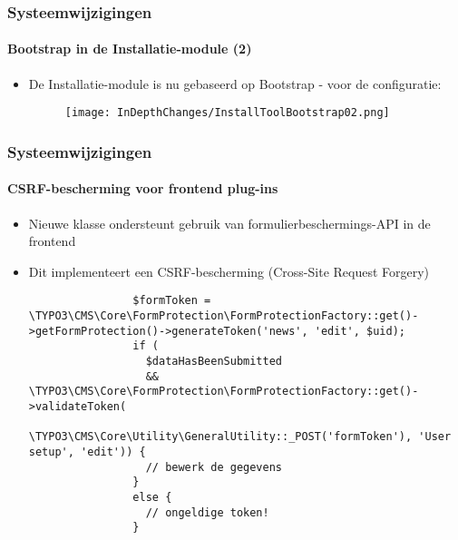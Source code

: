 \begin{frame}[fragile]
	\frametitle{Systeemwijzigingen}
	\framesubtitle{Bootstrap in de Installatie-module (2)}

	\begin{itemize}

		\item De Installatie-module is nu gebaseerd op Bootstrap - voor de configuratie:

			\begin{figure}
				\texttt{[image: InDepthChanges/InstallToolBootstrap02.png]}
			\end{figure}

	\end{itemize}

\end{frame}


\begin{frame}[fragile]
	\frametitle{Systeemwijzigingen}
	\framesubtitle{CSRF-bescherming voor frontend plug-ins}

	\lstset{basicstyle=\tiny\ttfamily}

	\begin{itemize}

		\item Nieuwe klasse ondersteunt gebruik van formulierbeschermings-API in de frontend

		\item Dit implementeert een CSRF-bescherming (Cross-Site Request Forgery)

			\begin{lstlisting}
				$formToken = \TYPO3\CMS\Core\FormProtection\FormProtectionFactory::get()->getFormProtection()->generateToken('news', 'edit', $uid);
				if (
				  $dataHasBeenSubmitted
				  && \TYPO3\CMS\Core\FormProtection\FormProtectionFactory::get()->validateToken(
				    \TYPO3\CMS\Core\Utility\GeneralUtility::_POST('formToken'), 'User setup', 'edit')) {
				  // bewerk de gegevens
				}
				else {
				  // ongeldige token!
				}
			\end{lstlisting}

	\end{itemize}

\end{frame}

